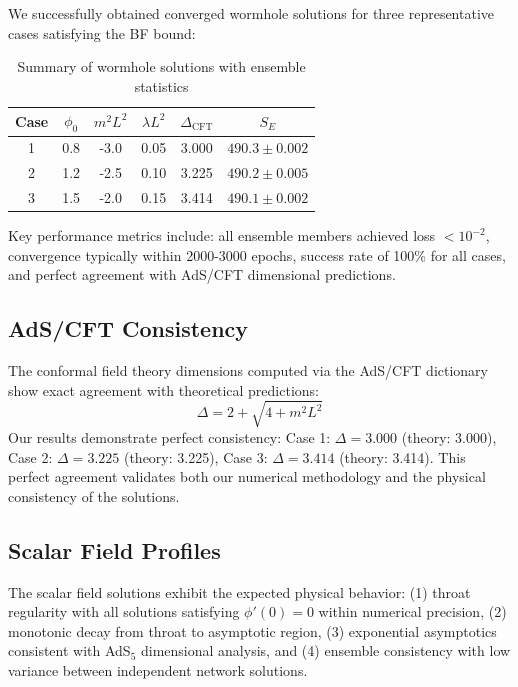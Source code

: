 \documentclass[aps,prd,twocolumn,showpacs,superscriptaddress]{revtex4-1}
\begin{document}
We successfully obtained converged wormhole solutions for three representative cases satisfying the BF bound:

\begin{table}[H]
\centering
\caption{Summary of wormhole solutions with ensemble statistics}
\begin{tabular}{cccccc}
\hline\hline
Case & $\phi_0$ & $m^2L^2$ & $\lambda L^2$ & $\Delta_{\text{CFT}}$ & $S_E$ \\
\hline
1 & 0.8 & -3.0 & 0.05 & 3.000 & $490.3 \pm 0.002$ \\
2 & 1.2 & -2.5 & 0.10 & 3.225 & $490.2 \pm 0.005$ \\
3 & 1.5 & -2.0 & 0.15 & 3.414 & $490.1 \pm 0.002$ \\
\hline\hline
\end{tabular}
\label{tab:results}
\end{table}

Key performance metrics include: all ensemble members achieved loss $< 10^{-2}$, convergence typically within 2000-3000 epochs, success rate of 100\% for all cases, and perfect agreement with AdS/CFT dimensional predictions.

\subsection{AdS/CFT Consistency}

The conformal field theory dimensions computed via the AdS/CFT dictionary show exact agreement with theoretical predictions:
%
\begin{equation}
\Delta = 2 + \sqrt{4 + m^2L^2}
\end{equation}
%
Our results demonstrate perfect consistency: Case 1: $\Delta = 3.000$ (theory: 3.000), Case 2: $\Delta = 3.225$ (theory: 3.225), Case 3: $\Delta = 3.414$ (theory: 3.414). This perfect agreement validates both our numerical methodology and the physical consistency of the solutions.

\subsection{Scalar Field Profiles}

The scalar field solutions exhibit the expected physical behavior: (1) throat regularity with all solutions satisfying $\phi'(0) = 0$ within numerical precision, (2) monotonic decay from throat to asymptotic region, (3) exponential asymptotics consistent with AdS$_5$ dimensional analysis, and (4) ensemble consistency with low variance between independent network solutions.
\end{document}
